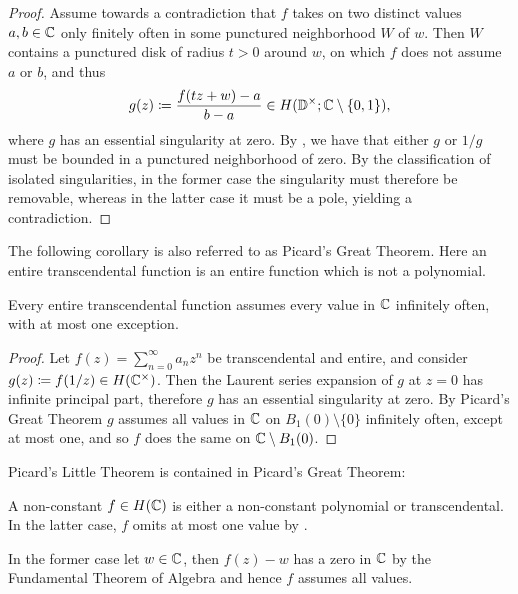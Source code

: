 \begin{proof}
    Assume towards a contradiction that $f$ takes on two distinct values $a, b \in \mathbb{C}$ only finitely often in some punctured neighborhood $W$ of $w$. Then $W$ contains a punctured disk of radius $t > 0$ around $w$, on which $f$ does not assume $a$ or $b$, and thus
    $$ g(z) \coloneqq \frac{f(t z + w) - a}{b - a} \in H(\mathbb{D}^\times; \mathbb{C} \setminus \{ 0, 1 \}), $$
    where $g$ has an essential singularity at zero. By , we have that either $g$ or $1/g$ must be bounded in a punctured neighborhood of zero. By the classification of isolated singularities, in the former case the singularity must therefore be removable, whereas in the latter case it must be a pole, yielding a contradiction.
\end{proof}

The following corollary is also referred to as Picard's Great Theorem. Here an entire transcendental function is an entire function which is not a polynomial.

\begin{corollary} \label{cor:transcendental-every-value-inf}
    Every entire transcendental function assumes every value in $\mathbb{C}$ infinitely often, with at most one exception.
\end{corollary}

\begin{proof}
    Let $f(z) = \sum_{n=0}^\infty a_n z^n$ be transcendental and entire, and consider $g(z) \coloneqq f(1 / z) \in H(\mathbb{C}^\times)$. Then the Laurent series expansion of $g$ at $z = 0$ has infinite principal part, therefore $g$ has an essential singularity at zero. By Picard's Great Theorem $g$ assumes all values in $\mathbb{C}$ on $B_1(0) \setminus \{ 0 \}$ infinitely often, except at most one, and so $f$ does the same on $\mathbb{C} \setminus B_1(0)$.
\end{proof}

\begin{remark}
    Picard's Little Theorem is contained in Picard's Great Theorem:
    
    A non-constant $f \in H(\mathbb{C})$ is either a non-constant polynomial or transcendental. In the latter case, $f$ omits at most one value by .
    
    In the former case let $w \in \mathbb{C}$, then $f(z) - w$ has a zero in $\mathbb{C}$ by the Fundamental Theorem of Algebra and hence $f$ assumes all values.
\end{remark}